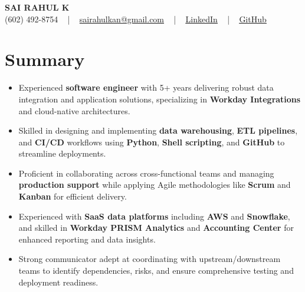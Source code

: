 \documentclass[letterpaper,11pt]{article}
\newcommand{\resumeItem}[1]{
  \item\footnotesize{
    {#1 \vspace{-2pt}}
  }
}
\newcommand{\resumeItemListStart}{\begin{itemize}[leftmargin=*]}
\newcommand{\resumeItemListEnd}{\end{itemize}\vspace{-5pt}}
\begin{document}
\begin{center}
    {\fontsize{14pt}{12pt}\selectfont \textbf{\MakeUppercase{Sai Rahul K}}}\\ \vspace{2pt}
    \fontsize{10pt}{12pt}\selectfont (602) 492-8754 ~ | ~ \href{mailto:sairahulkan@gmail.com}{sairahulkan@gmail.com} ~ | ~
    \href{https://www.linkedin.com/in/rq123/}{\color{blue}\underline{LinkedIn}} ~ | ~
    \href{https://github.com/kanrahuldo}{\color{blue}\underline{GitHub}}~
    \vspace{-8pt}
\end{center}

\section{Summary}
\fontsize{9pt}{10pt}\selectfont
\resumeItemListStart
    \resumeItem{Experienced \textbf{software engineer} with 5+ years delivering robust data integration and application solutions, specializing in \textbf{Workday Integrations} and cloud-native architectures.}
    \resumeItem{Skilled in designing and implementing \textbf{data warehousing}, \textbf{ETL pipelines}, and \textbf{CI/CD} workflows using \textbf{Python}, \textbf{Shell scripting}, and \textbf{GitHub} to streamline deployments.}
    \resumeItem{Proficient in collaborating across cross-functional teams and managing \textbf{production support} while applying Agile methodologies like \textbf{Scrum} and \textbf{Kanban} for efficient delivery.}
    \resumeItem{Experienced with \textbf{SaaS data platforms} including \textbf{AWS} and \textbf{Snowflake}, and skilled in \textbf{Workday PRISM Analytics} and \textbf{Accounting Center} for enhanced reporting and data insights.}
    \resumeItem{Strong communicator adept at coordinating with upstream/downstream teams to identify dependencies, risks, and ensure comprehensive testing and deployment readiness.}
\resumeItemListEnd
\vspace{-6pt}
\end{document}
